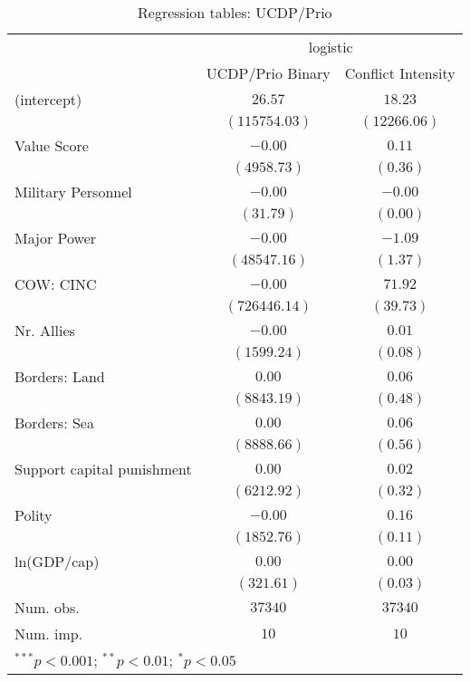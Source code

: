 
\begin{table}
\begin{center}
\begin{tabular}{l c c}
\toprule
 & \multicolumn{2}{c}{logistic} \\
\cmidrule(lr){2-3}
 & UCDP/Prio Binary & Conflict Intensity \\
\midrule
(intercept)                & $26.57$       & $18.23$      \\
                           & $(115754.03)$ & $(12266.06)$ \\
Value Score                & $-0.00$       & $0.11$       \\
                           & $(4958.73)$   & $(0.36)$     \\
Military Personnel         & $-0.00$       & $-0.00$      \\
                           & $(31.79)$     & $(0.00)$     \\
Major Power                & $-0.00$       & $-1.09$      \\
                           & $(48547.16)$  & $(1.37)$     \\
COW: CINC                  & $-0.00$       & $71.92$      \\
                           & $(726446.14)$ & $(39.73)$    \\
Nr. Allies                 & $-0.00$       & $0.01$       \\
                           & $(1599.24)$   & $(0.08)$     \\
Borders: Land              & $0.00$        & $0.06$       \\
                           & $(8843.19)$   & $(0.48)$     \\
Borders: Sea               & $0.00$        & $0.06$       \\
                           & $(8888.66)$   & $(0.56)$     \\
Support capital punishment & $0.00$        & $0.02$       \\
                           & $(6212.92)$   & $(0.32)$     \\
Polity                     & $-0.00$       & $0.16$       \\
                           & $(1852.76)$   & $(0.11)$     \\
ln(GDP/cap)                & $0.00$        & $0.00$       \\
                           & $(321.61)$    & $(0.03)$     \\
\midrule
Num. obs.                  & $37340$       & $37340$      \\
Num. imp.                  & $10$          & $10$         \\
\bottomrule
\multicolumn{3}{l}{\scriptsize{$^{***}p<0.001$; $^{**}p<0.01$; $^{*}p<0.05$}}
\end{tabular}
\caption{Regression tables: UCDP/Prio}
\label{UCDPreg}
\end{center}
\end{table}
